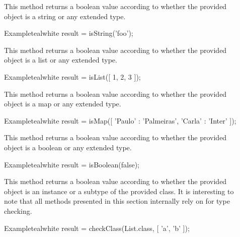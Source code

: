 \begin{description}
\item[] This method returns a boolean value according to whether the provided  object is a string or any extended type.

\begin{codebox}{Example}{teal}{\icnote}{white}
result = isString('foo');
\end{codebox}

\item[] This method returns a boolean value according to whether the provided  object is a list or any extended type.

\begin{codebox}{Example}{teal}{\icnote}{white}
result = isList([ 1, 2, 3 ]);
\end{codebox}

\item[] This method returns a boolean value according to whether the provided  object is a map or any extended type.

\begin{codebox}{Example}{teal}{\icnote}{white}
result = isMap([ 'Paulo' : 'Palmeiras', 'Carla' : 'Inter' ]);
\end{codebox}

\item[] This method returns a boolean value according to whether the provided  object is a boolean or any extended type.

\begin{codebox}{Example}{teal}{\icnote}{white}
result = isBoolean(false);
\end{codebox}

\item[] This method returns a boolean value according to whether the provided  object is an instance or a subtype of the provided  class. It is interesting to note that all methods presented in this section internally rely on  for type checking.

\begin{codebox}{Example}{teal}{\icnote}{white}
result = checkClass(List.class, [ 'a', 'b' ]);
\end{codebox}
\end{description}

